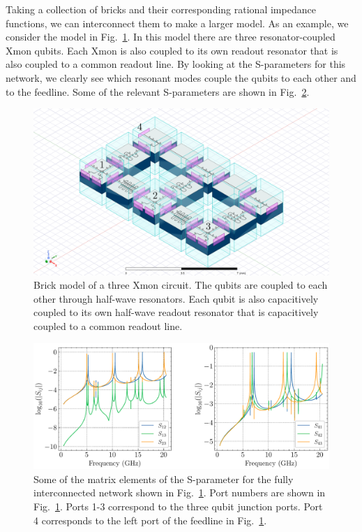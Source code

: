\newpage

Taking a collection of bricks and their corresponding rational impedance functions, we can interconnect them to make a larger model. As an example, we consider the model in Fig.\ \ref{fig:triple_xmon}. In this model there are three resonator-coupled Xmon qubits. Each Xmon is also coupled to its own readout resonator that is also coupled to a common readout line. By looking at the S-parameters for this network, we clearly see which resonant modes couple the qubits to each other and to the feedline. Some of the relevant S-parameters are shown in Fig.\ \ref{fig:triple_xmon_S}.

\begin{figure}[h!]
    \centering
    \includegraphics[width=\textwidth]{figures/triple_qubit_labeled.png}
    \caption{Brick model of a three Xmon circuit. The qubits are coupled to each other through half-wave resonators. Each qubit is also capacitively coupled to its own half-wave readout resonator that is capacitively coupled to a common readout line.}
    \label{fig:triple_xmon}
\end{figure}

\begin{figure}[h!]
    \centering
    \includegraphics[width=\textwidth]{figures/three_qubit_S.pdf}
    \caption{Some of the matrix elements of the S-parameter for the fully interconnected network shown in Fig.\ \ref{fig:triple_xmon}. Port numbers are shown in Fig.\ \ref{fig:triple_xmon}. Ports 1-3 correspond to the three qubit junction ports. Port 4 corresponds to the left port of the feedline in Fig.\ \ref{fig:triple_xmon}.}
    \label{fig:triple_xmon_S}
\end{figure}

